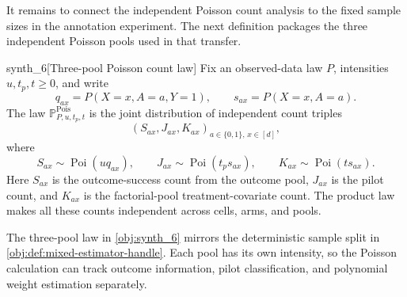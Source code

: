 It remains to connect the independent Poisson count analysis to the fixed sample sizes in the annotation experiment. The next definition packages the three independent Poisson pools used in that transfer.

\begin{definitionv}{synth_6}[Three-pool Poisson count law]
Fix an observed-data law \(P\), intensities \(u,t_p,t\ge0\), and write
\[
q_{ax}=P(X=x,A=a,Y=1),
\qquad
s_{ax}=P(X=x,A=a).
\]
The law \(\mathbb P^{\mathrm{Pois}}_{P,u,t_p,t}\) is the joint distribution of independent count triples
\[
(S_{ax},J_{ax},K_{ax})_{a\in\{0,1\},\,x\in[d]},
\]
where
\[
S_{ax}\sim\operatorname{Poi}(u q_{ax}),\qquad
J_{ax}\sim\operatorname{Poi}(t_p s_{ax}),\qquad
K_{ax}\sim\operatorname{Poi}(t s_{ax}).
\]
Here \(S_{ax}\) is the outcome-success count from the outcome pool, \(J_{ax}\) is the pilot count, and \(K_{ax}\) is the factorial-pool treatment-covariate count. The product law makes all these counts independent across cells, arms, and pools.
\end{definitionv}

The three-pool law in \cref{obj:synth_6} mirrors the deterministic sample split in \cref{obj:def:mixed-estimator-handle}. Each pool has its own intensity, so the Poisson calculation can track outcome information, pilot classification, and polynomial weight estimation separately.

